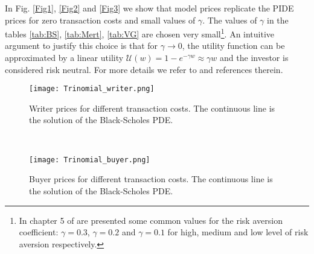 In Fig. \ref{Fig1}, \ref{Fig2} and \ref{Fig3} we show that model prices replicate the PIDE prices for zero transaction costs and small values of $\gamma$. 
The values of $\gamma$ in the tables \ref{tab:BS},
\ref{tab:Mert}, \ref{tab:VG} are chosen very small\footnote{ In chapter 5 of \cite{GK99} are presented some common values for the risk aversion coefficient: $\gamma=0.3$, $\gamma=0.2$ and $\gamma=0.1$ for high, medium and low level of risk aversion respectively.}. 
An intuitive argument to justify this choice is that for $\gamma \to 0$, the utility function 
can be approximated by a linear utility $\mathcal{U}(w) = 1 - e^{-\gamma w} \approx \gamma w$ and the investor is considered risk neutral. 
For more details we refer to \cite{Carmona} and references therein. 
\begin{figure}[t!]
 \begin{minipage}[b]{0.5\linewidth}
   \centering
   \texttt{[image: Trinomial\_writer.png]}
   \caption{Writer prices for different transaction costs. The continuous line is the solution of the Black-Scholes PDE.}
   \label{Fig4} 
 \end{minipage}
 \ \hspace{2mm} \hspace{3mm} \
 \begin{minipage}[b]{0.5\linewidth}
  \centering
   \texttt{[image: Trinomial\_buyer.png]}
   \caption{Buyer prices for different transaction costs. The continuous line is the solution of the Black-Scholes PDE.}
   \label{Fig5}
 \end{minipage}
\end{figure}
